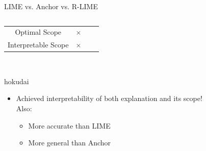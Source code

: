 \documentclass[unicode]{beamer}
\begin{document}
\begin{frame}
\begin{columns}[t]
\begin{column}{.97\linewidth}
\begin{block}{LIME vs. Anchor vs. R-LIME}
\begin{columns}
\begin{column}{\rcol\textwidth}
\begin{center}
\begin{tabular}{cccc}
								Optimal Scope       & $\times$     & \checkmark{} & \checkmark{}    \\
								Interpretable Scope & $\times$     & \checkmark{} & \checkmark{}    \\
							\end{tabular}
						\end{center}
						\vspace{1.5em}
						\begin{center}~%
							\begin{beamercolorbox}[wd=.9\textwidth,colsep=.5em,rounded=true,shadow=true]{hokudai}%
								\begin{itemize}
									\item Achieved interpretability of both explanation and its scope! \\ [0.8em]
									      Also:
									      \begin{itemize}
										      \Large
										      \item More accurate than LIME
										      \item More general than Anchor
									      \end{itemize}
								\end{itemize}
							\end{beamercolorbox}~%
						\end{center}
					\end{column}
				\end{columns}
			\end{block}
		\end{column}
	\end{columns}
\end{frame}
\end{document}
